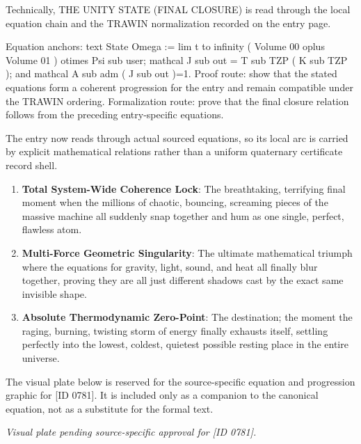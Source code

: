 Technically, THE UNITY STATE (FINAL CLOSURE) is read through the local equation chain and the TRAWIN normalization recorded on the entry page.

Equation anchors: text State Omega := lim t to infinity ( Volume 00 oplus Volume 01 ) otimes Psi sub user; mathcal J sub out = T sub TZP ( K sub TZP ); and mathcal A sub adm ( J sub out )=1. Proof route: show that the stated equations form a coherent progression for the entry and remain compatible under the TRAWIN ordering. Formalization route: prove that the final closure relation follows from the preceding entry-specific equations.

The entry now reads through actual sourced equations, so its local arc is carried by explicit mathematical relations rather than a uniform quaternary certificate record shell.
\endgroup

\begin{enumerate}[leftmargin=1.6em,itemsep=6pt,topsep=4pt]
\item \textbf{Total System-Wide Coherence Lock}: The breathtaking, terrifying final moment when the millions of chaotic, bouncing, screaming pieces of the massive machine all suddenly snap together and hum as one single, perfect, flawless atom.
\item \textbf{Multi-Force Geometric Singularity}: The ultimate mathematical triumph where the equations for gravity, light, sound, and heat all finally blur together, proving they are all just different shadows cast by the exact same invisible shape.
\item \textbf{Absolute Thermodynamic Zero-Point}: The destination; the moment the raging, burning, twisting storm of energy finally exhausts itself, settling perfectly into the lowest, coldest, quietest possible resting place in the entire universe.
\end{enumerate}

\begingroup\footnotesize\sloppy
The visual plate below is reserved for the source-specific equation and progression graphic for [ID 0781]. It is included only as a companion to the canonical equation, not as a substitute for the formal text.
\par\endgroup
\begingroup\footnotesize\itshape
Visual plate pending source-specific approval for [ID 0781].
\par\endgroup

